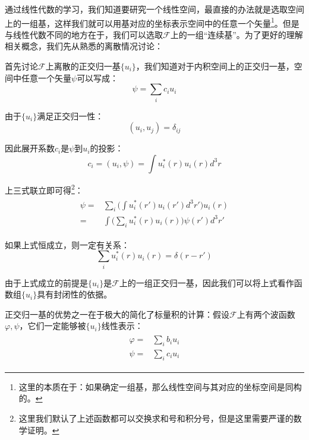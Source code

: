     通过线性代数的学习，我们知道要研究一个线性空间，最直接的办法就是选取空间上的一组基，这样我们就可以用基对应的坐标表示空间中的任意一个矢量\footnote{这里的本质在于：如果确定一组基，那么线性空间与其对应的坐标空间是同构的。}。但是与线性代数不同的地方在于，我们可以选取$\mathscr{F}$上的一组“连续基”。为了更好的理解相关概念，我们先从熟悉的离散情况讨论：
    
    首先讨论$\mathscr{F}$上离散的正交归一基$\{u_i\}$，我们知道对于内积空间上的正交归一基，空间中任意一个矢量$\psi$可以写成：
    \begin{equation}
        \psi=\sum_{i}c_iu_i
    \end{equation}
    
    由于$\{u_i\}$满足正交归一性：
    \begin{equation}
        (u_i,u_j)=\delta_{ij}
    \end{equation}
    
    因此展开系数$c_i$是$\psi$到$u_i$的投影：
    \begin{equation}
        c_i=(u_i,\psi)=\int u_i^{*}(r)u_i(r)d^3r
    \end{equation}
   
    
    上三式联立即可得\footnote{这里我们默认了上述函数都可以交换求和号和积分号，但是这里需要严谨的数学证明。}：
    \begin{align}
        \begin{split}
            \psi=&\sum_i\Big(\int u_i^{*}(r')u_i(r')d^3r'\Big)u_i(r)\\
            =&\int \Big(\sum_i u_i^*(r)u_i(r) \Big)\psi(r')d^3r'
        \end{split}
    \end{align}
    
    如果上式恒成立，则一定有关系：
    \begin{equation}
        \sum_i u_i^*(r)u_i(r)=\delta(r-r')
    \end{equation}
    
    由于上式成立的前提是$\{u_i\}$是$\mathscr{F}$上的一组正交归一基，因此我们可以将上式看作函数组$\{u_i\}$具有封闭性的依据。
    
    正交归一基的优势之一在于极大的简化了标量积的计算：假设$\mathscr{F}$上有两个波函数$\varphi,\psi$，它们一定能够被$\{u_i\}$线性表示：
    \begin{align}
        \begin{split}
            \varphi=&\sum_i b_i u_i\\
            \psi =& \sum_i c_i u_i
        \end{split}
    \end{align}
    
